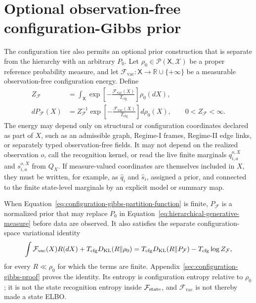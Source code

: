 \section{Optional observation-free configuration-Gibbs prior}

The configuration tier also permits an optional prior construction that is separate from the hierarchy with an arbitrary \(P_0\). Let \(\rho_0\in\mathcal P(\mathsf X,\mathscr X)\) be a proper reference probability measure, and let
\(\mathcal F_{\mathrm{vac}}:\mathsf X\to\mathbb R\cup\{+\infty\}\) be a measurable observation-free configuration energy. Define
\begin{align}
Z_{\mathcal F}
&=\int_{\mathsf X}
\exp\left[-\frac{\mathcal F_{\mathrm{vac}}(X)}{T_{\mathrm{cfg}}}\right]
\rho_0(dX),
\label{eq:configuration-gibbs-partition-function}\\
dP_{\mathcal F}(X)
&=Z_{\mathcal F}^{-1}
\exp\left[-\frac{\mathcal F_{\mathrm{vac}}(X)}{T_{\mathrm{cfg}}}\right]
d\rho_0(X),
\qquad
0<Z_{\mathcal F}<\infty.
\label{eq:configuration-gibbs-prior}
\end{align}
The energy may depend only on structural or configuration coordinates declared as part of \(X\), such as an admissible graph, Regime-I frames, Regime-II edge links, or separately typed observation-free fields. It may not depend on the realized observation \(o\), call the recognition kernel, or read the live finite marginals \(q_{i,a}^{o,X}\) and \(s_{i,a}^{o,X}\) from \(Q_X\). If measure-valued coordinates are themselves included in \(X\), they must be written, for example, as \(\widehat q_i\) and \(\widehat s_i\), assigned a prior, and connected to the finite state-level marginals by an explicit model or summary map.

When Equation~\eqref{eq:configuration-gibbs-partition-function} is finite, \(P_{\mathcal F}\) is a normalized prior that may replace \(P_0\) in Equation~\eqref{eq:hierarchical-generative-measure} before data are observed. It also satisfies the separate configuration-space variational identity
\begin{equation}
\int\mathcal F_{\mathrm{vac}}(X)R(dX)
+T_{\mathrm{cfg}}D_{\mathrm{KL}}(R\Vert\rho_0)
=T_{\mathrm{cfg}}D_{\mathrm{KL}}(R\Vert P_{\mathcal F})
-T_{\mathrm{cfg}}\log Z_{\mathcal F},
\label{eq:configuration-gibbs-variational-identity}
\end{equation}
for every \(R\ll\rho_0\) for which the terms are finite. Appendix~\ref{sec:configuration-gibbs-proof} proves the identity. Its entropy is configuration entropy relative to \(\rho_0\); it is not the state recognition entropy inside \(\mathcal F_{\mathrm{state}}\), and \(\mathcal F_{\mathrm{vac}}\) is not thereby made a state ELBO.

